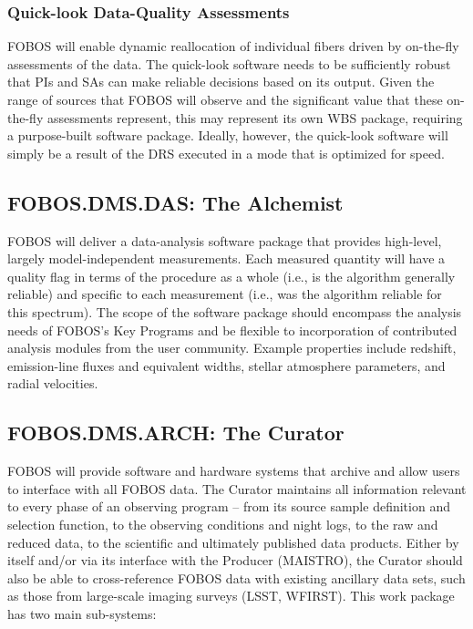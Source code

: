 \documentclass[oneside,11pt]{amsart}
\begin{document}
\subsubsection{Quick-look Data-Quality Assessments}

FOBOS will enable dynamic reallocation of individual fibers driven by
on-the-fly assessments of the data. The quick-look software needs to
be sufficiently robust that PIs and SAs can make reliable decisions
based on its output. Given the range of sources that FOBOS will
observe and the significant value that these on-the-fly assessments
represent, this may represent its own WBS package, requiring a
purpose-built software package. Ideally, however, the quick-look
software will simply be a result of the DRS executed in a mode that
is optimized for speed.

\subsection{FOBOS.DMS.DAS: The Alchemist}

FOBOS will deliver a data-analysis software package that provides
high-level, largely model-independent measurements. Each measured
quantity will have a quality flag in terms of the procedure as a
whole (i.e., is the algorithm generally reliable) and specific to
each measurement (i.e., was the algorithm reliable for this
spectrum). The scope of the software package should encompass the
analysis needs of FOBOS’s Key Programs and be flexible to
incorporation of contributed analysis modules from the user
community. Example properties include redshift, emission-line fluxes
and equivalent widths, stellar atmosphere parameters, and radial
velocities.

\subsection{FOBOS.DMS.ARCH: The Curator}

FOBOS will provide software and hardware systems that archive and
allow users to interface with all FOBOS data. The Curator maintains
all information relevant to every phase of an observing program –
from its source sample definition and selection function, to the
observing conditions and night logs, to the raw and reduced data, to
the scientific and ultimately published data products. Either by
itself and/or via its interface with the Producer (MAISTRO), the
Curator should also be able to cross-reference FOBOS data with
existing ancillary data sets, such as those from large-scale imaging
surveys (LSST, WFIRST). This work package has two main sub-systems:
\end{document}
